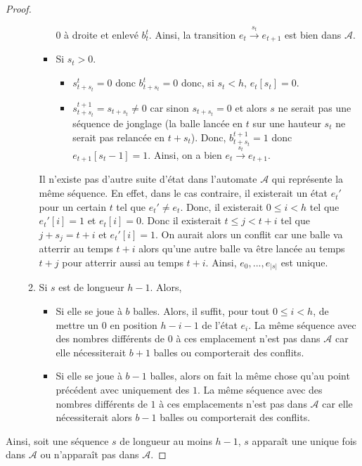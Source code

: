 \documentclass[a4paper, 11pt]{article}
\theoremstyle{plain}
\begin{document}
\begin{proof}
\begin{itemize}
\begin{enumerate}
\begin{itemize}
        $0$ à droite et enlevé $b_t^t$. Ainsi, la transition
        $e_t \xrightarrow{s_t} e_{t + 1}$ est bien dans $\mathcal{A}$.
      \item Si $s_t > 0$.
        \begin{itemize}
        \item $s_{t + s_t}^t = 0$ donc $b_{t + s_t}^t = 0$ donc, si $s_t < h$,
          $e_t[s_t] = 0$.
        \item $s_{t + s_t}^{t + 1} = s_{t + s_t} \neq 0$ car sinon
          $s_{t + s_t} = 0$ et alors $s$ ne serait pas une séquence de jonglage
          (la balle lancée en $t$ sur une hauteur $s_t$ ne serait pas relancée
          en $t + s_t$). Donc, $b_{t + s_t}^{t + 1} = 1$ donc
          $e_{t + 1}[s_t - 1] = 1$. Ainsi, on a bien
          $e_t \xrightarrow{s_t} e_{t + 1}$.
        \end{itemize}
      \end{itemize}
      Il n'existe pas d'autre suite d'état dans l'automate $\mathcal{A}$ qui
      représente la même séquence. En effet, dans le cas contraire, il
      existerait un état $e_t'$ pour un certain $t$ tel que $e_t' \neq e_t$.
      Donc, il existerait $0 \leq i < h$ tel que $e_t'[i] = 1$ et $e_t[i] = 0$.
      Donc il existerait $t \leq j < t + i$ tel que $j + s_j = t + i$ et
      $e_t'[i] = 1$. On aurait alors un conflit car une balle va atterrir au
      temps $t + i$ alors qu'une autre balle va être lancée au temps $t + j$
      pour atterrir aussi au temps $t + i$. Ainsi, $e_0, ..., e_|s|$ est unique.
    \item Si $s$ est de longueur $h - 1$. Alors,
      \begin{itemize}
      \item Si elle se joue à $b$ balles. Alors, il suffit, pour tout
        $0 \leq i < h$, de mettre un $0$ en position $h - i - 1$ de l'état
        $e_i$. La même séquence avec des nombres différents de $0$ à ces
        emplacement n'est pas dans $\mathcal{A}$ car elle nécessiterait $b + 1$
        balles ou comporterait des conflits.
      \item Si elle se joue à $b - 1$ balles, alors on fait la même chose qu'au
        point précédent avec uniquement des $1$. La même séquence avec des
        nombres différents de $1$ à ces emplacements n'est pas dans
        $\mathcal{A}$ car elle nécessiterait alors $b - 1$ balles ou
        comporterait des conflits.
      \end{itemize}
    \end{enumerate}
  \end{itemize}
  Ainsi, soit une séquence $s$ de longueur au moins $h - 1$, $s$ apparaît une
  unique fois dans $\mathcal{A}$ ou n'apparaît pas dans $\mathcal{A}$.
\end{proof}
\end{document}
